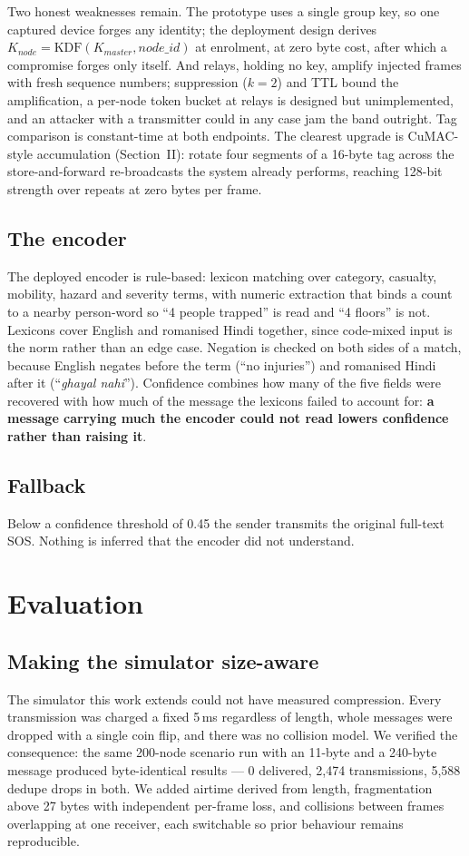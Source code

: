 \documentclass[conference]{IEEEtran}
\begin{document}
Two honest weaknesses remain. The prototype uses a single group key, so one
captured device forges any identity; the deployment design derives
$K_{node} = \mathrm{KDF}(K_{master}, \mathit{node\_id})$ at enrolment, at
zero byte cost, after which a compromise forges only itself. And relays,
holding no key, amplify injected frames with fresh sequence numbers;
suppression ($k{=}2$) and TTL bound the amplification, a per-node token
bucket at relays is designed but unimplemented, and an attacker with a
transmitter could in any case jam the band outright. Tag comparison is
constant-time at both endpoints. The clearest upgrade is CuMAC-style
accumulation (Section~II): rotate four segments of a 16-byte tag across the
store-and-forward re-broadcasts the system already performs, reaching 128-bit
strength over repeats at zero bytes per frame.

\subsection{The encoder}
The deployed encoder is rule-based: lexicon matching over category, casualty,
mobility, hazard and severity terms, with numeric extraction that binds a count
to a nearby person-word so ``4 people trapped'' is read and ``4 floors'' is
not. Lexicons cover English and romanised Hindi together, since code-mixed
input is the norm rather than an edge case. Negation is checked on both sides
of a match, because English negates before the term (``no injuries'') and
romanised Hindi after it (``\emph{ghayal nahi}''). Confidence combines how many
of the five fields were recovered with how much of the message the lexicons
failed to account for: \textbf{a message carrying much the encoder could not
read lowers confidence rather than raising it}.

\subsection{Fallback}
Below a confidence threshold of 0.45 the sender transmits the original
full-text SOS. Nothing is inferred that the encoder did not understand.

\section{Evaluation}

\subsection{Making the simulator size-aware}
The simulator this work extends could not have measured compression. Every
transmission was charged a fixed 5\,ms regardless of length, whole messages
were dropped with a single coin flip, and there was no collision model. We
verified the consequence: the same 200-node scenario run with an 11-byte and a
240-byte message produced byte-identical results --- 0 delivered, 2{,}474
transmissions, 5{,}588 dedupe drops in both. We added airtime derived from
length, fragmentation above 27 bytes with independent per-frame loss, and
collisions between frames overlapping at one receiver, each switchable so prior
behaviour remains reproducible.
\end{document}
